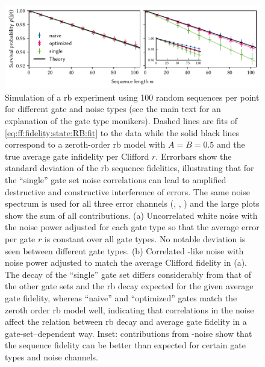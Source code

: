 \begin{figure}
    \centering
    \includegraphics{img/pdf/filter_functions/randomized_benchmarking}
    \caption[]{
        Simulation of a \gls{rb} experiment using \num{100} random sequences per point for different gate and noise types (see the main text for an explanation of the gate type monikers).
        Dashed lines are fits of \cref{eq:ff:fidelity:state:RB:fit} to the data while the solid black lines correspond to a zeroth-order \gls{rb} model with $A=B=\num{0.5}$ and the true average gate infidelity per Clifford $r$.
        Errorbars show the standard deviation of the \gls{rb} sequence fidelities, illustrating that for the \enquote{single} gate set noise correlations can lead to amplified destructive and constructive interference of errors.
        The same noise spectrum is used for all three error channels (\sx, \sy, \sz) and the large plots show the sum of all contributions.
        (a) Uncorrelated white noise with the noise power adjusted for each gate type so that the average error per gate $r$ is constant over all gate types.
        No notable deviation is seen between different gate types.
        (b) Correlated \oneoverf-like noise with noise power adjusted to match the average Clifford fidelity in (a).
        The decay of the \enquote{single} gate set differs considerably from that of the other gate sets and the \gls{rb} decay expected for the given average gate fidelity, whereas \enquote{naive} and \enquote{optimized} gates match the zeroth order \gls{rb} model well, indicating that correlations in the noise affect the relation between \gls{rb} decay and average gate fidelity in a gate-set--dependent way.
        Inset: contributions from \sz-noise show that the sequence fidelity can be better than expected for certain gate types and noise channels.
    }
    \label{fig:ff:randomized_benchmarking:noise_comparison}
\end{figure}

